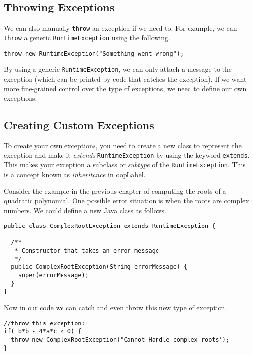 \subsection{Throwing Exceptions}

We can also manually \texttt{throw} an exception
if we need to.  For example, we can \texttt{throw}
a generic \texttt{RuntimeException} using the following.

\begin{verbatim}
throw new RuntimeException("Something went wrong");
\end{verbatim}

By using a generic \texttt{RuntimeException}, we
can only attach a message to the exception (which can be
printed by code that catches the exception).  If we want
more fine-grained control over the type of exceptions, we
need to define our own exceptions.

\subsection{Creating Custom Exceptions}

To create your own exceptions, you need to create a new
class to represent the exception and make it \emph{extends} 
\texttt{RuntimeException} by using the keyword
\texttt{extends}.  This makes your exception a 
subclass or \emph{subtype} of the \texttt{RuntimeException}.
This is a concept known as \emph{inheritance} in \gls{oopLabel}.

Consider the example in the previous chapter of computing
the roots of a quadratic polynomial.  One possible error 
situation is when the roots are complex numbers.  We could
define a new Java class as follows.

\begin{verbatim}
public class ComplexRootException extends RuntimeException {

  /**
   * Constructor that takes an error message
   */
  public ComplexRootException(String errorMessage) {
    super(errorMessage);
  }
}
\end{verbatim}

Now in our code we can catch and even throw this new type
of exception.

\begin{verbatim}
//throw this exception:
if( b*b - 4*a*c < 0) {
  throw new ComplexRootException("Cannot Handle complex roots");
}
\end{verbatim}

